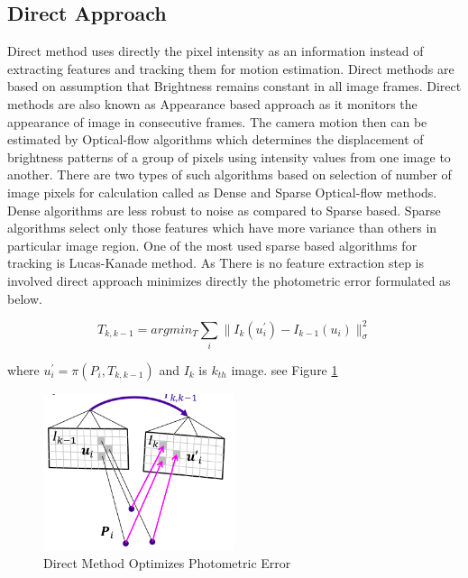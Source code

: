 \subsection{Direct Approach}

Direct method uses directly the pixel intensity as an information instead of extracting features and tracking them for motion estimation. Direct methods are based on assumption that Brightness remains constant in all image frames.\cite{Irani-et-al-1999} Direct methods are also known as Appearance based approach as it monitors the appearance of image in consecutive frames. The camera motion then can be estimated by Optical-flow algorithms which determines the displacement of brightness patterns of a group of pixels using intensity values from one image to another.\cite{Aqel-et-al-2016} There are two types of such algorithms based on selection of number of image pixels for calculation called as Dense and Sparse Optical-flow methods. Dense algorithms are less robust to noise as compared to Sparse based. Sparse algorithms select only those features which have more variance than others in particular image region. One of the most used sparse based algorithms for tracking is Lucas-Kanade method.\cite{Lucas81aniterative} As There is no feature extraction step is involved direct approach minimizes directly the photometric error formulated as below. 

\begin{equation*}
	T_{k,k-1} = arg min_{T} \sum_{i} \| I_{k}(u^{'}_{i})- I_{k-1}(u_{i})\|^{2}_{\sigma}
\end{equation*}

where   $u^{'}_{i} = \pi (P_{i},T_{k,k-1})$ and $I_{k} $ is  $k_{th}$ image. see Figure \ref{fig:direct}

\begin{figure}[h]
	\centering
	\includegraphics[width=0.5\textwidth]{direct}
	\caption{Direct Method Optimizes Photometric Error}
	\label{fig:direct}
\end{figure}

